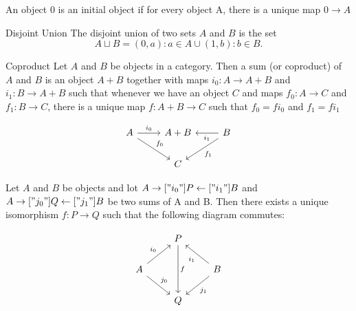 \begin{definition}
  An object $0$ is an initial object if for every object A, there is a unique
  map $ 0 \rightarrow A $
\end{definition}

\begin{definition}{Disjoint Union}
  The disjoint union of two sets $A$ and $B$ is the set 
  $$ A \sqcup B = {(0,a):a \in A} \cup {(1,b):b \in B}. $$
\end{definition}

\begin{definition}{Coproduct}
  Let $A$ and $B$ be objects in a category.
  Then a sum (or coproduct) of $A$ and $B$ is an object $A + B$
  together with maps $i_0 : A \rightarrow A + B $ and $i_1 : B \rightarrow A + B $
  such that whenever we have an object $C$ and maps
  $f_0 : A \rightarrow C$ and $f_1 : B \rightarrow C$, there is a unique map
  $f : A + B \rightarrow C$ such that $f_0 = fi_0 $ and $f_1 = fi_1$

  \[
  \begin{tikzcd}
  A \arrow[dr, "f_0"] \arrow[r, "i_0"] & A + B & \arrow[l, "i_1"] \arrow[dl, "f_1"] B \\
                                       &   C   & 
  \end{tikzcd}
  \]
  
\end{definition}

\begin{theorem}
  Let $ A $ and $B$ be objects and lot $ A \rightarrow["i_0"] P \leftarrow["i_1"] B $ and
  $ A \rightarrow["j_0"] Q \leftarrow["j_1"] B $ be two sums of A and B.
  Then there exists a unique isomorphism $f:P \rightarrow Q $ such that the following diagram commutes:

  \[
  \begin{tikzcd}
  & P \arrow[dd, "f"] &   \\
  A  \arrow[dr, "j_0"] \arrow[ur, "i_0"]  & & B \arrow[ul, "i_1"] \arrow[dl, "j_1"]\\
  & Q                 &   \\
  \end{tikzcd}
  \]
\end{theorem}
